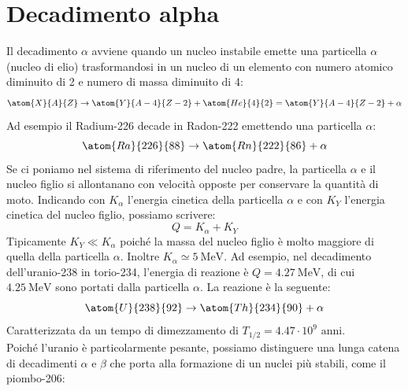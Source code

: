 \section{Decadimento alpha}
Il decadimento $\alpha$ avviene quando un nucleo instabile emette una particella $\alpha$ (nucleo di elio) trasformandosi in un nucleo di un elemento con numero atomico diminuito di 2 e numero di massa diminuito di 4:
\begin{equation}
    \atom{X}{A}{Z} \to \atom{Y}{A-4}{Z-2} + \atom{He}{4}{2} = \atom{Y}{A-4}{Z-2} + \alpha
\end{equation}
Ad esempio il Radium-226 decade in Radon-222 emettendo una particella $\alpha$:
\begin{equation}
    \atom{Ra}{226}{88} \to \atom{Rn}{222}{86} + \alpha
\end{equation}
Se ci poniamo nel sistema di riferimento del nucleo padre, la particella $\alpha$ e il nucleo figlio si allontanano con velocità opposte per conservare la quantità di moto. Indicando con $K_\alpha$ l'energia cinetica della particella $\alpha$ e con $K_Y$ l'energia cinetica del nucleo figlio, possiamo scrivere:
\begin{equation}
    Q = K_\alpha + K_Y
\end{equation}
Tipicamente $K_Y \ll K_\alpha$ poiché la massa del nucleo figlio è molto maggiore di quella della particella $\alpha$. Inoltre $K_\alpha \simeq \qty{5}{\mega\electronvolt}$. Ad esempio, nel decadimento dell'uranio-238 in torio-234, l'energia di reazione è $Q = \qty{4.27}{\mega\electronvolt}$, di cui $\qty{4.25}{\mega\electronvolt}$ sono portati dalla particella $\alpha$. La reazione è la seguente:
\begin{equation}
    \atom{U}{238}{92} \to \atom{Th}{234}{90} + \alpha
\end{equation}
Caratterizzata da un tempo di dimezzamento di $T_{1/2} = 4.47 \cdot 10^9 \text{ anni}$.\\
Poiché l'uranio è particolarmente pesante, possiamo distinguere una lunga catena di decadimenti $\alpha$ e $\beta$ che porta alla formazione di un nuclei più stabili, come il piombo-206:


